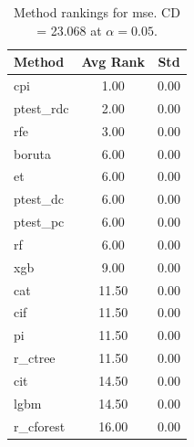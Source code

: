 \begin{table}[h]
\centering
\caption{Method rankings for mse. CD = 23.068 at $\alpha=0.05$.}
\label{tab:ranks_mse}
\begin{tabular}{lcc}
\toprule
Method & Avg Rank & Std \\
\midrule
cpi & 1.00 & 0.00 \\
ptest_rdc & 2.00 & 0.00 \\
rfe & 3.00 & 0.00 \\
boruta & 6.00 & 0.00 \\
et & 6.00 & 0.00 \\
ptest_dc & 6.00 & 0.00 \\
ptest_pc & 6.00 & 0.00 \\
rf & 6.00 & 0.00 \\
xgb & 9.00 & 0.00 \\
cat & 11.50 & 0.00 \\
cif & 11.50 & 0.00 \\
pi & 11.50 & 0.00 \\
r_ctree & 11.50 & 0.00 \\
cit & 14.50 & 0.00 \\
lgbm & 14.50 & 0.00 \\
r_cforest & 16.00 & 0.00 \\
\bottomrule
\end{tabular}
\end{table}